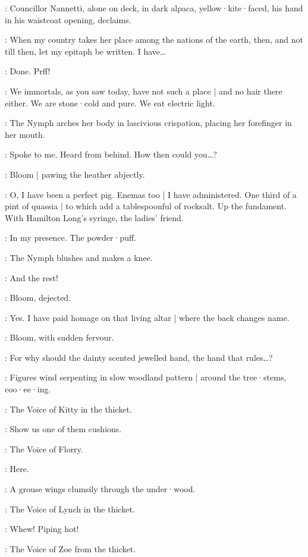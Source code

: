 :
Councillor Nannetti,
alone on deck,
in dark alpaca,
yellow·kite·faced,
his hand in his waistcoat opening,
declaims.

\CouncillorNannetti:
When my country takes her place among the nations of the earth,
then,
and not till then,
let my epitaph be written.
I have…

\Bloom:
Done.
Prff!
%

\Nymph:
We immortals,
as you saw today,
have not such a place |
and no hair there either.
We are stone·cold and pure.
We eat electric light.

:
The Nymph arches her body in lascivious crispation,
placing her forefinger in her mouth.

\Nymph:
Spoke to me.
Heard from behind.
How then could you…?

:
Bloom |
pawing the heather abjectly.

\Bloom:
O,
I have been a perfect pig.
Enemas too |
I have administered.
One third of a pint of quassia |
to which add a tablespoonful of rocksalt.
Up the fundament.
With Hamilton Long's syringe,
the ladies' friend.%

\Nymph:
In my presence.
The powder·puff.

:
The Nymph blushes and makes a knee.

\Nymph:
And the rest!

:
Bloom,
dejected.

\Bloom:
Yes.
I have paid homage on that living altar |
where the back changes name.

:
Bloom,
with sudden fervour.

\Bloom:
For why should the dainty scented jewelled hand,
the hand that rules…?

:
Figures wind serpenting in slow woodland pattern |
around the tree·stems,
coo·ee·ing.

:
The Voice of Kitty in the thicket.

\Kitty:
Show us one of them cushions.

:
The Voice of Florry.

\Florry:
Here.

:
A grouse wings clumsily through the under·wood.

:
The Voice of Lynch in the thicket.

\Lynch:
Whew!
Piping hot!

:
The Voice of Zoe from the thicket.

